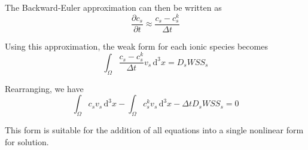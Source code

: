 The Backward-Euler approximation can then be written as
\begin{equation}
  \frac{\partial c_s}{\partial t} \approx \frac{c_s - c_s^k}{\Delta t}
\end{equation}

Using this approximation, the weak form for each ionic species becomes
\begin{equation}
  \int_\Omega \frac{c_s - c_s^k}{\Delta t} v_s \,\mathrm{d}^3x
  = D_s WSS_s
\end{equation}
 
Rearranging, we have
\begin{equation}
  \boxed{
    \int_\Omega c_s  v_s \,\mathrm{d}^3x
    - \int_\Omega c_s^k  v_s \,\mathrm{d}^3x
    - \Delta t D_s WSS_s = 0
  }
\end{equation}

This form is suitable for the addition of all equations into a single
nonlinear form for solution.
